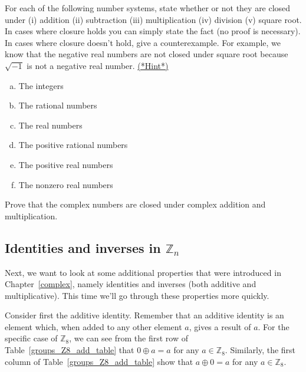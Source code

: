 \begin{exercise}{53}
For each of the following number systems, state whether or not they are closed under (i) addition (ii) subtraction (iii) multiplication (iv) division (v) square root. In cases where closure holds you can simply state the fact (no proof is necessary). In cases where closure doesn't hold, give a counterexample. For example, we know that the negative real numbers are not closed under square root because $\sqrt{-1}$ is not a negative real number.
\hyperref[sec:modular_arithmetic:hints]{(*Hint*)}  
\begin{multicols}{2}
\begin{enumerate}[(a)]
\item
The integers 
\item
The rational numbers
\item
The real numbers
\item
The positive rational numbers
\item
The positive real numbers
\item
The nonzero real numbers
\end{enumerate}
\end{multicols}
\end{exercise}

\begin{exercise}{54}
Prove that the complex numbers are closed under complex addition and multiplication.
\end{exercise}

\subsection{Identities and inverses in ${\mathbb Z}_n$}
Next, we want to look at some additional properties that were introduced in Chapter~\ref{complex}, namely 
 identities  and inverses (both additive and multiplicative).  
This time we'll go through these properties more quickly.

Consider first the additive identity. Remember that an additive identity is an element which, when added to any other element $a$, gives a result of $a$.  For the specific case of ${\mathbb Z}_8$, we can see from the first row of Table~\ref{groups_Z8_add_table} that 
$0 \oplus a = a $ for any $a \in {\mathbb Z}_8$. Similarly, the first column of Table~\ref{groups_Z8_add_table} show that $a \oplus 0 = a$ for any $a \in {\mathbb Z}_8$. 

